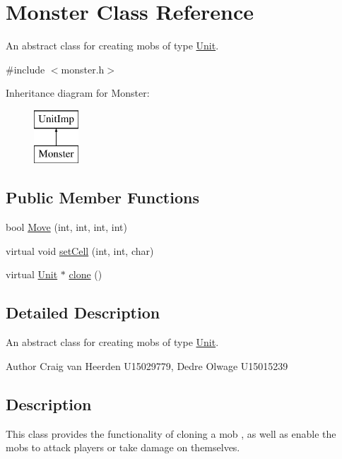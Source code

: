 \hypertarget{class_monster}{\section{\-Monster \-Class \-Reference}
\label{class_monster}
}


\-An abstract class for creating mobs of type \hyperlink{class_unit}{\-Unit}.  




{\ttfamily \#include $<$monster.\-h$>$}

\-Inheritance diagram for \-Monster\-:\begin{figure}[H]
\begin{center}
\leavevmode
\includegraphics[height=2.000000cm]{class_monster}
\end{center}
\end{figure}
\subsection*{\-Public \-Member \-Functions}
\begin{DoxyCompactItemize}
\item 
bool \hyperlink{class_monster_a7ffc80573d07ce8aa1761c2a3c83d224}{\-Move} (int, int, int, int)
\item 
virtual void \hyperlink{class_monster_ad6d065914fe528df5331f15ef77189c9}{set\-Cell} (int, int, char)
\item 
virtual \hyperlink{class_unit}{\-Unit} $\ast$ \hyperlink{class_monster_a5697717fca1588b82c9b9f35fe9f73ff}{clone} ()
\end{DoxyCompactItemize}


\subsection{\-Detailed \-Description}
\-An abstract class for creating mobs of type \hyperlink{class_unit}{\-Unit}. 

\begin{DoxyAuthor}{\-Author}
\-Craig van \-Heerden \-U15029779, \-Dedre \-Olwage \-U15015239
\end{DoxyAuthor}
\hypertarget{class_unit_factory_Description}{}\subsection{\-Description}\label{class_unit_factory_Description}
\-This class provides the functionality of cloning a mob , as well as enable the mobs to attack players or take damage on themselves. 

